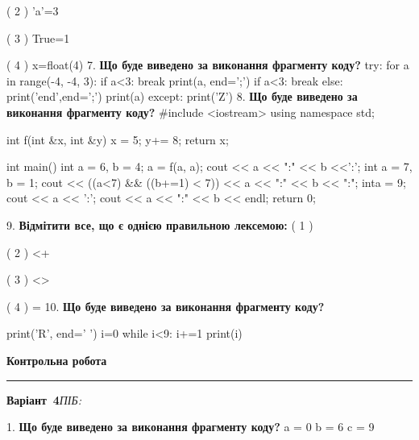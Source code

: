 \documentclass[11pt]{article}
\begin{document}
{{{( 2 ) 'a'=3

( 3 ) True=1

( 4 ) x=float(4)
\vspace{5mm}
7. \textbf{Що буде виведено за виконання фрагменту коду?}
try:
    for a in range(-4, -4, 3):
        if a<3:
            break
        print(a, end=';')
        if a<3:
            break
    else:
        print('end',end=';')
    print(a)
except:
    print('Z')
\vspace{5mm}
8. \textbf{Що буде виведено за виконання фрагменту коду?}
#include <iostream>
using namespace std;

int f(int &x, int &y){
    x = 5;
    y+= 8;
    return x;
}

int main(){
    int a = 6, b = 4;
    a = f(a, a);
    cout << a << ":" << b <<':';
    {
        int a = 7, b = 1;
        cout << ((a<7) && ((b+=1) < 7))
             << a << ":" << b << ":";
    }
    {
        inta = 9;
        cout << a << ':';
    }
    cout << a << ":" << b << endl;
    return 0;
}

\vspace{5mm}
9. %
\textbf{Відмітити все, що є однією правильною лексемою:}
( 1 ) {

( 2 ) <+

( 3 ) <>

( 4 ) =
\vspace{5mm}
10. \textbf{Що буде виведено за виконання фрагменту коду?}

print('R', end=' ')
i=0
while i<9:
    i+=1
print(i)

\vspace{5mm}










\newpage

\newpage

{\centering\Large\bfseries Контрольна робота\par}
\medskip
\noindent\rule{\linewidth}{0.5pt}
\smallskip
\noindent\textbf{Варіант \No\,4}\hfill \textit{ПІБ:}\,\underline{\hspace{60mm}}
\vspace{4mm}

1. \textbf{Що буде виведено за виконання фрагменту коду?}
a = 0
b = 6
c = 9

}}}}
\end{document}
